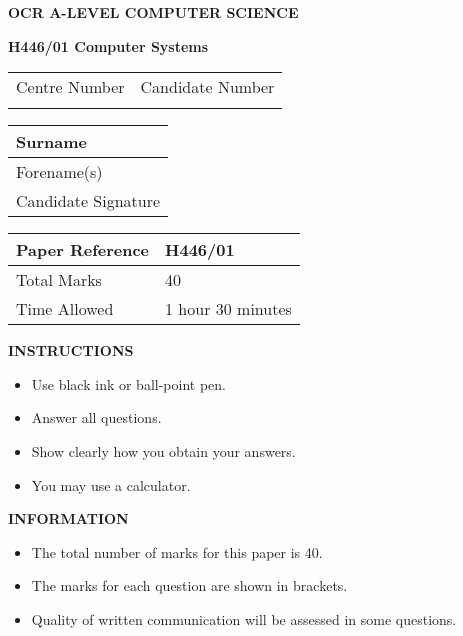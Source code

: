 \documentclass[12pt]{article}
\begin{document}
\begin{center}
{\large\textbf{OCR A-LEVEL COMPUTER SCIENCE}}

\vspace{1cm}

{\Large\textbf{H446/01 Computer Systems}}

\vspace{1cm}

\begin{tabular}{|p{}|p{}|}
\hline
Centre Number & Candidate Number \\
\rule{0pt}{1cm} & \rule{0pt}{1cm} \\
\hline
\end{tabular}

\vspace{1cm}

\begin{tabular}{|p{}|}
\hline
Surname \rule{0pt}{1cm} \\
\hline
Forename(s) \rule{0pt}{1cm} \\
\hline
Candidate Signature \rule{0pt}{1cm} \\
\hline
\end{tabular}

\vspace{1cm}

\begin{tabular}{|l|l|}
\hline
Paper Reference & H446/01 \\
\hline
Total Marks & 40 \\
\hline
Time Allowed & 1 hour 30 minutes \\
\hline
\end{tabular}

\vspace{1cm}

\textbf{INSTRUCTIONS}
\begin{itemize}
\item Use black ink or ball-point pen.
\item Answer all questions.
\item Show clearly how you obtain your answers.
\item You may use a calculator.
\end{itemize}

\textbf{INFORMATION}
\begin{itemize}
\item The total number of marks for this paper is 40.
\item The marks for each question are shown in brackets.
\item Quality of written communication will be assessed in some questions.
\end{itemize}
\end{center}
\end{document}
